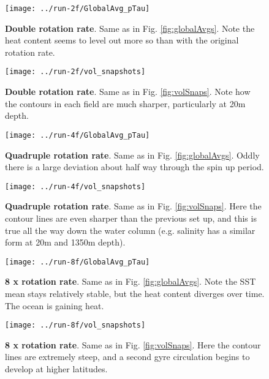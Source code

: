 \documentclass[a4paper,11pt]{article}
\begin{document}

\begin{figure}
\centering
\texttt{[image: ../run-2f/GlobalAvg\_pTau]}
\caption{\textbf{Double rotation rate}. Same as in Fig. \ref{fig:globalAvgs}. Note the heat content seems to level out more so than with the original rotation rate. }
\label{fig:2f_globalAvgs}
\end{figure}

\begin{figure}
\centering
\texttt{[image: ../run-2f/vol\_snapshots]}
\caption{\textbf{Double rotation rate}. Same as in Fig. \ref{fig:volSnaps}. Note how the contours in each field are much sharper, particularly at 20m depth. }
\label{fig:2f_volSnaps}
\end{figure}


\begin{figure}
\centering
\texttt{[image: ../run-4f/GlobalAvg\_pTau]}
\caption{\textbf{Quadruple rotation rate}. Same as in Fig. \ref{fig:globalAvgs}. Oddly there is a large deviation about half way through the spin up period. }
\label{fig:4f_globalAvgs}
\end{figure}

\begin{figure}
\centering
\texttt{[image: ../run-4f/vol\_snapshots]}
\caption{\textbf{Quadruple rotation rate}. Same as in Fig. \ref{fig:volSnaps}. Here the contour lines are even sharper than the previous set up, and this is true all the way down the water column (e.g. salinity has a similar form at 20m and 1350m depth).}
\label{fig:4f_volSnaps}
\end{figure}


\begin{figure}
\centering
\texttt{[image: ../run-8f/GlobalAvg\_pTau]}
\caption{\textbf{8 x rotation rate}. Same as in Fig. \ref{fig:globalAvgs}. Note the SST mean stays relatively stable, but the heat content diverges over time. The ocean is gaining heat. }
\label{fig:8f_globalAvgs}
\end{figure}

\begin{figure}
\centering
\texttt{[image: ../run-8f/vol\_snapshots]}
\caption{\textbf{8 x rotation rate}. Same as in Fig. \ref{fig:volSnaps}. Here the contour lines are extremely steep, and a second gyre circulation begins to develop at higher latitudes. }
\label{fig:8f_volSnaps}
\end{figure}
\end{document}

